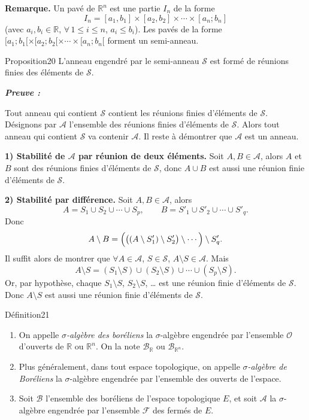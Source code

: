 \documentclass[11pt,a4paper]{article}
\newcommand{\R}{\mathbb{R}}
\newcommand{\A}{\mathscr{A}}
\newcommand{\B}{\mathscr{B}}
\newcommand{\Ss}{\mathscr{S}}
\newcommand{\Oo}{\mathscr{O}}
\newcommand{\Ff}{\mathscr{F}}
\newenvironment{preuve}{\par\textit{\textbf{Preuve :}}\par\nopagebreak[4]}{\par}
\begin{document}
\textbf{\color{bleu}Remarque.}
Un pavé de $\R^n$ est une partie $I_n$ de la forme
\[
  I_n=[a_1,b_1]\times[a_2,b_2]\times\cdots\times[a_n;b_n]
\]
(avec $a_i,b_i\in\R$, $\forall\,1\le i\le n$, $a_i\le b_i$).
Les pavés de la forme $[a_1;b_1[\times[a_2;b_2[\times\cdots\times[a_n;b_n[$ forment un semi-anneau.

\begin{enonce}{Proposition}{20}
L'anneau engendré par le semi-anneau $\Ss$ est formé de réunions finies des éléments de $\Ss$.
\end{enonce}

\begin{preuve}\end{preuve}
Tout anneau qui contient $\Ss$ contient les réunions finies d'éléments de $\Ss$.
Désignons par $\A$ l'ensemble des réunions finies d'éléments de $\Ss$. Alors tout anneau qui contient $\Ss$
va contenir $\A$. Il reste à démontrer que $\A$ est un anneau.

\textbf{1) Stabilité de $\A$ par réunion de deux éléments.}
Soit $A,B\in\A$, alors $A$ et $B$ sont des réunions finies d'éléments de $\Ss$, donc $A\cup B$ est aussi
une réunion finie d'éléments de $\Ss$.

\textbf{2) Stabilité par différence.} Soit $A,B\in\A$, alors
\[
  A=S_1\cup S_2\cup\cdots\cup S_p,\qquad B=S'_1\cup S'_2\cup\cdots\cup S'_q .
\]
Donc
\[
  A\setminus B=\Bigl(\bigl((A\setminus S'_1)\setminus S'_2\bigr)\setminus\cdots\Bigr)\setminus S'_q .
\]
Il suffit alors de montrer que $\forall A\in\A$, $S\in\Ss$, $A\setminus S\in\A$.
Mais
\[
  A\setminus S=(S_1\setminus S)\cup(S_2\setminus S)\cup\cdots\cup(S_p\setminus S).
\]
Or, par hypothèse, chaque $S_1\setminus S$, $S_2\setminus S$, \ldots{} est une réunion finie d'éléments de $\Ss$.
Donc $A\setminus S$ est aussi une réunion finie d'éléments de $\Ss$.



\begin{enonce}{Définition}{21}
\begin{enumerate}[label=\textbf{\arabic*)},leftmargin=1.2cm]
  \item On appelle \emph{$\sigma$-algèbre des boréliens} la $\sigma$-algèbre engendrée par l'ensemble $\Oo$ d'ouverts
        de $\R$ ou $\R^n$. On la note $\B_{\R}$ ou $\B_{\R^n}$.
  \item Plus généralement, dans tout espace topologique, on appelle \emph{$\sigma$-algèbre de Boréliens}
        la $\sigma$-algèbre engendrée par l'ensemble des ouverts de l'espace.
  \item Soit $\B$ l'ensemble des boréliens de l'espace topologique $E$, et soit $\A$ la $\sigma$-algèbre
        engendrée par l'ensemble $\Ff$ des fermés de $E$.
\end{enumerate}
\end{enonce}
\end{document}
